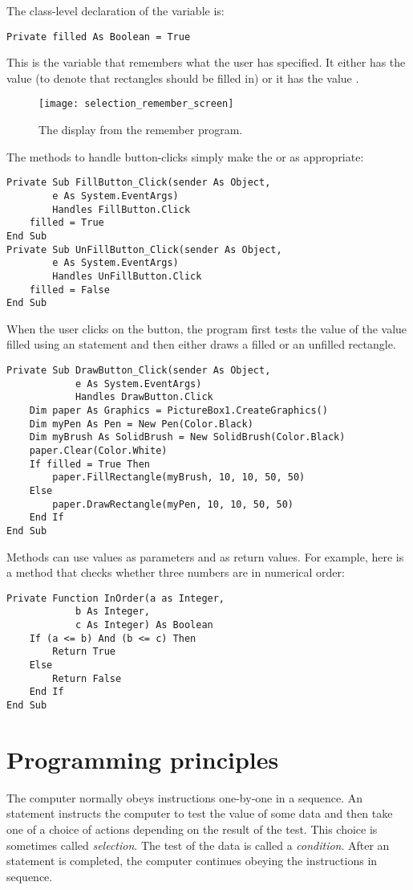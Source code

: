 		The class-level declaration of the  variable is:
		\begin{lstlisting}
Private filled As Boolean = True
		\end{lstlisting}
		This is the variable that remembers what the user has specified. It either has the value  (to denote that rectangles should be filled in) or it has the value .
		
		
		\begin{figure}[th]
			\centering
			\texttt{[image: selection\_remember\_screen]}
			\caption{The display from the remember program.}
			\label{fig:selection_remember_screen}
		\end{figure}


		The methods to handle button-clicks simply make the   or  as appropriate:
		\begin{lstlisting}
Private Sub FillButton_Click(sender As Object,
		e As System.EventArgs)
		Handles FillButton.Click
	filled = True
End Sub
Private Sub UnFillButton_Click(sender As Object,
		e As System.EventArgs)
		Handles UnFillButton.Click
	filled = False
End Sub
		\end{lstlisting}
		When the user clicks on the  button, the program first tests the value of the  value filled using an  statement and then either draws a filled or an unfilled rectangle.
		\begin{lstlisting}
Private Sub DrawButton_Click(sender As Object,
			e As System.EventArgs)
			Handles DrawButton.Click
	Dim paper As Graphics = PictureBox1.CreateGraphics()
	Dim myPen As Pen = New Pen(Color.Black)
	Dim myBrush As SolidBrush = New SolidBrush(Color.Black)
	paper.Clear(Color.White)
	If filled = True Then
		paper.FillRectangle(myBrush, 10, 10, 50, 50)
	Else
		paper.DrawRectangle(myPen, 10, 10, 50, 50)
	End If
End Sub
		\end{lstlisting}
		Methods can use  values as parameters and as return values. For example, here is a method that checks whether three numbers are in numerical order:
		\begin{lstlisting}
Private Function InOrder(a as Integer,
			b As Integer,
			c As Integer) As Boolean
	If (a <= b) And (b <= c) Then
		Return True
	Else
		Return False
	End If
End Sub
		\end{lstlisting}


  \section{Programming principles}
	The computer normally obeys instructions one-by-one in a sequence. An  statement instructs the computer to test the value of some data and then take one of a choice of actions depending on the result of the test. This choice is sometimes called \emph{selection}. The test of the data is called a \emph{condition}. After an  statement is completed, the computer continues obeying the instructions in sequence.


